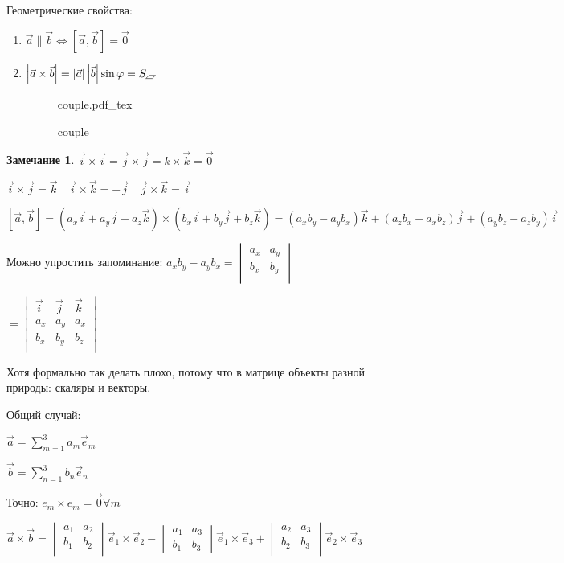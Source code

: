 \documentclass{book}
\theoremstyle{definition}
\newtheorem*{note}{Замечание}
\newcommand{\incfig}[1]{%
    \def\svgwidth{\columnwidth}
    {#1.pdf_tex}
}
\begin{document}
 Геометрические свойства:
 \begin{enumerate}
     \item $\vec a \parallel \vec b \Longleftrightarrow \left[ \vec a, \vec b \right] = \vec 0 $ 
     \item $\left| \vec a \times \vec b \right| = \left| \vec a \right| \left| \vec b \right| \sin \varphi  = S_{\tikz[scale=0.1] \draw (0,0) -- (1,1) -- (3,1) -- (2,0) -- cycle;}$

\begin{figure}[ht]
    \centering
    \incfig{couple}
    \caption{couple}
    \label{fig:couple}
\end{figure}
 \end{enumerate}

 \begin{note}
     $\vec i \times  \vec i = \vec j \times \vec j = k \times \vec k = \vec 0$
     
     $\vec i \times \vec j = \vec k\quad \vec i \times  \vec k = -\vec j\quad \vec j\times  \vec k = \vec i$

     $[\vec a, \vec b] = (a_x\vec i + a_y\vec j + a_z\vec k) \times (b_x\vec i + b_y\vec j + b_z\vec k) = (a_xb_y - a_yb_x)\vec k + (a_zb_x-a_xb_z)\vec j  + (a_yb_z - a_zb_y)\vec i$

     Можно упростить запоминание: $a_xb_y-a_yb_x = 
     \begin{vmatrix}
         a_x&a_y\\
         b_x&b_y\\
     \end{vmatrix}$ 

     $=
     \begin{vmatrix}
         \vec i & \vec j & \vec k\\
         a_x & a_y & a_x\\
         b_x & b_y & b_z\\
     \end{vmatrix}$

     Хотя формально так делать плохо, потому что в матрице объекты разной природы: скаляры и векторы.
 \end{note}

Общий случай: 

$\vec a = \sum_{m=1}^{3} a_m\vec e_m$

$\vec b = \sum_{n=1}^{3} b_n\vec e_n$

Точно: $e_m \times  e_m = \vec 0 \forall m$

$\vec a \times  \vec b = 
\begin{vmatrix}
    a_1 & a_2\\ b_1 & b_2\\
\end{vmatrix} \vec e_1 \times \vec e_2 - 
\begin{vmatrix}
    a_1 & a_3\\ b_1 & b_3
\end{vmatrix} \vec e_1\times  \vec e_3 + 
\begin{vmatrix}
    a_2 & a_3\\ b_2 & b_3\\
\end{vmatrix} \vec e_2 \times \vec e_3$
\end{document}
